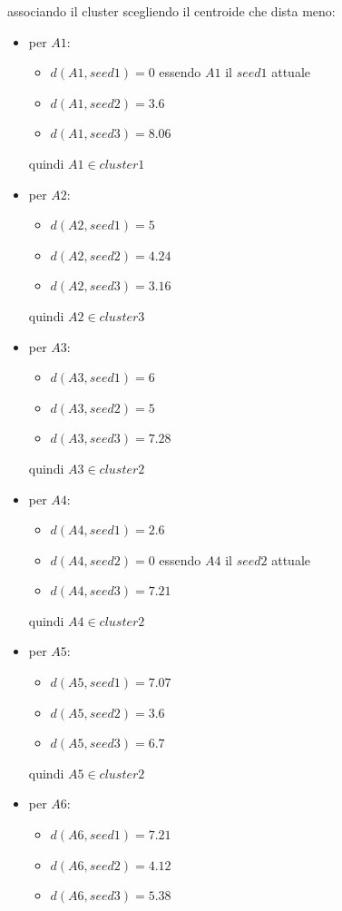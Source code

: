 \documentclass[a4paper,12pt, oneside]{book}
\begin{document}
\begin{esercizio}
  associando il cluster scegliendo il centroide che dista meno:
  \begin{itemize}
    \item per $A1$:
    \begin{itemize}
      \item $d(A1,seed1)=0$ essendo $A1$ il $seed1$ attuale
      \item $d(A1,seed2)=3.6$
      \item $d(A1,seed3)=8.06$
    \end{itemize}
    quindi $A1\in cluster1$
    \item per $A2$:
    \begin{itemize}
      \item $d(A2,seed1)=5$ 
      \item $d(A2,seed2)=4.24$
      \item $d(A2,seed3)=3.16$
    \end{itemize}
    quindi $A2\in cluster3$
    \item per $A3$:
    \begin{itemize}
      \item $d(A3,seed1)=6$ 
      \item $d(A3,seed2)=5$
      \item $d(A3,seed3)=7.28$
    \end{itemize}
    quindi $A3\in cluster2$
    \item per $A4$:
    \begin{itemize}
      \item $d(A4,seed1)=2.6$ 
      \item $d(A4,seed2)=0$ essendo $A4$ il $seed2$ attuale
      \item $d(A4,seed3)=7.21$
    \end{itemize}
    quindi $A4\in cluster2$
    \item per $A5$:
    \begin{itemize}
      \item $d(A5,seed1)=7.07$ 
      \item $d(A5,seed2)=3.6$
      \item $d(A5,seed3)=6.7$
    \end{itemize}
    quindi $A5\in cluster2$
    \item per $A6$:
    \begin{itemize}
      \item $d(A6,seed1)=7.21$ 
      \item $d(A6,seed2)=4.12$
      \item $d(A6,seed3)=5.38$

\end{itemize}
\end{itemize}
\end{esercizio}
\end{document}
